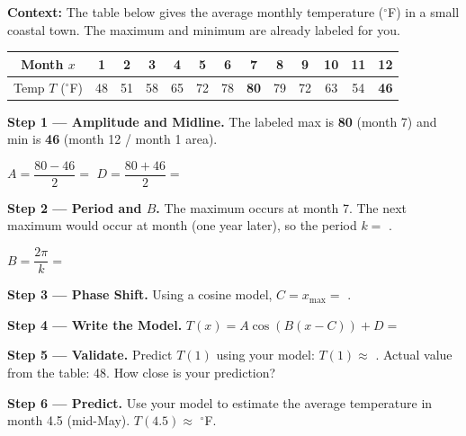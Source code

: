 \documentclass[10pt]{article}
\begin{document}
\begin{tcolorbox}[colback=white, colframe=black!40,
    title=\textbf{Tier R --- Reinforce},
    fonttitle=\bfseries, arc=2mm, left=3mm, right=3mm, top=2mm, bottom=2mm]

\textbf{Context:} The table below gives the average monthly temperature (${}^\circ$F)
in a small coastal town. The maximum and minimum are already labeled for you.

\vspace{4pt}
\begin{center}
\renewcommand{\arraystretch}{1.35}
\small
\begin{tabular}{|c|c|c|c|c|c|c|c|c|c|c|c|c|}
\hline
Month $x$ & 1 & 2 & 3 & 4 & 5 & 6 & 7 & 8 & 9 & 10 & 11 & 12 \\
\hline
Temp $T$ (${}^\circ$F) & 48 & 51 & 58 & 65 & 72 & 78 & \textbf{80} & 79 & 72 & 63 & 54 & \textbf{46} \\
\hline
\end{tabular}
\end{center}

\vspace{6pt}
\textbf{Step 1 --- Amplitude and Midline.}
The labeled max is \textbf{80} (month 7) and min is \textbf{46} (month 12 / month 1 area).

$A = \dfrac{80 - 46}{2} = $ \underline{\hspace{2cm}} \qquad
$D = \dfrac{80 + 46}{2} = $ \underline{\hspace{2cm}}

\vspace{6pt}
\textbf{Step 2 --- Period and $B$.}
The maximum occurs at month 7. The next maximum would occur at month
\underline{\hspace{1.2cm}} (one year later), so the period $k = $ \underline{\hspace{1.2cm}}.

$B = \dfrac{2\pi}{k} = $ \underline{\hspace{3cm}}

\vspace{6pt}
\textbf{Step 3 --- Phase Shift.}
Using a cosine model, $C = x_{\max} = $ \underline{\hspace{1.5cm}}.

\vspace{6pt}
\textbf{Step 4 --- Write the Model.}
$T(x) = A\cos(B(x - C)) + D = $ \underline{\hspace{7cm}}

\vspace{6pt}
\textbf{Step 5 --- Validate.}
Predict $T(1)$ using your model: $T(1) \approx$ \underline{\hspace{2.5cm}}.
Actual value from the table: 48. How close is your prediction? \writeline

\vspace{6pt}
\textbf{Step 6 --- Predict.}
Use your model to estimate the average temperature in month 4.5 (mid-May).
$T(4.5) \approx $ \underline{\hspace{2.5cm}} ${}^\circ$F.

\end{tcolorbox}
\end{document}
